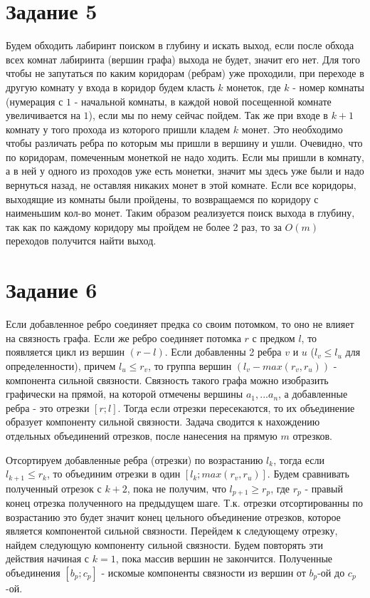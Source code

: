 \documentclass[a4paper,12pt]{article}
\begin{document}
\section*{Задание 5}
\hspace{0.5cm}
Будем обходить лабиринт поиском в глубину и искать выход, если после обхода всех комнат лабиринта (вершин графа) выхода не будет, значит его нет. Для того чтобы не запутаться по каким коридорам (ребрам) уже проходили, при переходе в другую комнату у входа в коридор будем класть $k$ монеток, где $k$ - номер комнаты (нумерация с $1$ - начальной комнаты, в каждой новой посещенной комнате увеличивается на $1$), если мы по нему сейчас пойдем. Так же при входе в $k+1$ комнату у того прохода из которого пришли кладем $k$ монет. Это необходимо чтобы различать ребра по которым мы пришли в вершину и ушли. Очевидно, что по коридорам, помеченным монеткой не надо ходить. Если мы пришли в комнату, а в ней у одного из проходов уже есть монетки, значит мы здесь уже были и надо вернуться назад, не оставляя никаких монет в этой комнате. Если все коридоры, выходящие из комнаты были пройдены, то возвращаемся по коридору с наименьшим кол-во монет. Таким образом реализуется поиск выхода в глубину, так как по каждому коридору мы пройдем не более 2 раз, то за $O(m)$ переходов получится найти выход.

\section*{Задание 6}
\hspace{0.5cm}
Если добавленное ребро соединяет предка со своим потомком, то оно не влияет на связность графа. Если же ребро соединяет потомка $r$ с предком $l$, то появляется цикл из вершин $(r-l)$. Если добавленны 2 ребра $v$ и $u$ ($l_{v}\leq l_{u}$ для определенности), причем $l_{u}\leq r_{v}$, то группа вершин $(l_{v}-max(r_{v},r_{u}))$ - компонента сильной связности. Связность такого графа можно изобразить графически на прямой, на которой отмечены вершины $a_{1},...a_{n}$, а добавленные ребра - это отрезки $[r; l]$. Тогда если отрезки пересекаются, то их объединение образует компоненту сильной связности. Задача сводится к нахождению отдельных объединений отрезков, после нанесения на прямую $m$ отрезков.

Отсортируем добавленные ребра (отрезки) по возрастанию $l_{k}$, тогда если $l_{k+1}\leq r_{k}$, то объединим отрезки в один $[l_{k}; max(r_{v},r_{u})]$. Будем сравнивать полученный отрезок с $k+2$, пока не получим, что $l_{p+1}\geq r_{p}$, где $r_{p}$ - правый конец отрезка полученного на предыдущем шаге. Т.к. отрезки отсортированны по возрастанию это будет значит конец цельного объединение отрезков, которое является компонентой сильной связности. Перейдем к следующему отрезку, найдем следующую компоненту сильной связности. Будем повторять эти действия начиная с $k=1$, пока массив вершин не закончится. Полученные объединения $[b_{p}; c_{p}]$ - искомые компоненты связности из вершин от $b_{p}$-ой до $c_{p}$-ой. 
\end{document}
